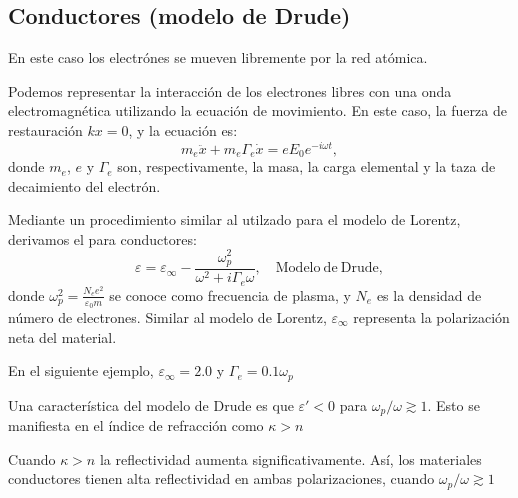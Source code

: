 \documentclass[letterpaper,10pt,english]{jupyterBook}
\let\sphinxpxdimen\pdfpxdimen\else\newdimen\sphinxpxdimen
\begin{document}
\subsection{Conductores (modelo de Drude)}
\label{\detokenize{3_Interacci_xf3n_materia-luz/3_Interacci_xf3n_materia-luz:conductores-modelo-de-drude}}
\sphinxAtStartPar
En este caso los electrónes se mueven libremente por la red atómica.

\sphinxAtStartPar
Podemos representar la interacción de los electrones libres con una onda electromagnética utilizando la ecuación de movimiento. En este caso, la fuerza de restauración \(kx = 0\), y la ecuación es:
\begin{equation*}
m_e\ddot{x} + m_e\Gamma_e \dot{x} = eE_0 e^{-i\omega t},
\end{equation*}
\sphinxAtStartPar
donde \(m_e\), \(e\) y \(\Gamma_e\) son, respectivamente, la masa, la carga elemental y la taza de decaimiento del electrón.

\sphinxAtStartPar
Mediante un procedimiento similar al utilzado para el modelo de Lorentz, derivamos el  para conductores:
\label{equation:3_Interacción_materia-luz/3_Interacción_materia-luz:3b07a6e8-13e7-48a5-a2b2-6b7ed4ccd3da}\begin{equation}
\varepsilon = \varepsilon_\infty - \frac{\omega_p^2}{\omega^2 + i\Gamma_e \omega},\quad\mathrm{Modelo~de~Drude},
\end{equation}
\sphinxAtStartPar
donde \(\omega_p^2 = \frac{N_ee^2}{\varepsilon_0 m}\) se conoce como frecuencia de plasma, y \(N_e\) es la densidad de número de electrones. Similar al modelo de Lorentz, \(\varepsilon_\infty\) representa la polarización neta del material.

\sphinxAtStartPar
En el siguiente ejemplo, \(\varepsilon_\infty = 2.0\) y \(\Gamma_e = 0.1\omega_p\)

\noindent{\hspace*{\fill}\sphinxincludegraphics[width=800\sphinxpxdimen]{{drude_model}.svg}\hspace*{\fill}}

\sphinxAtStartPar
Una característica del modelo de Drude es que \(\varepsilon' < 0\) para \(\omega_p/\omega \gtrsim 1\). Esto se manifiesta en el índice de refracción como \(\kappa > n\)

\sphinxAtStartPar
Cuando \(\kappa > n\) la reflectividad aumenta significativamente. Así, los materiales conductores tienen alta reflectividad en ambas polarizaciones, cuando \(\omega_p/\omega \gtrsim 1\)
\end{document}
